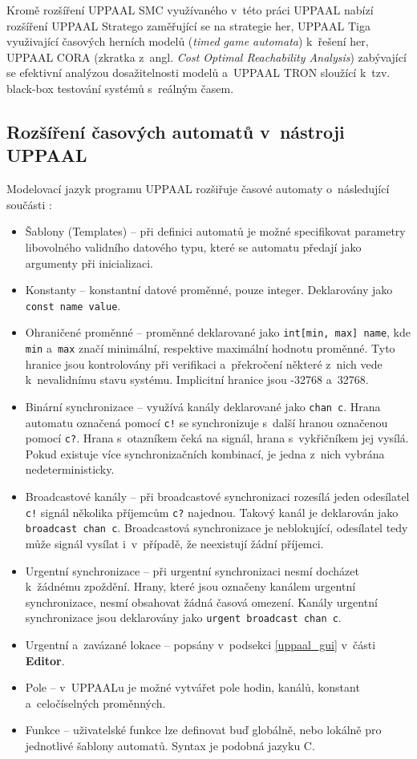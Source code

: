 Kromě rozšíření UPPAAL SMC využívaného v~této práci UPPAAL nabízí rozšíření UPPAAL Stratego zaměřující se na strategie her, UPPAAL Tiga využivající časových herních modelů (\textit{timed game automata}) k~řešení her, UPPAAL CORA (zkratka z~angl. \textit{Cost Optimal Reachability Analysis}) zabývající se efektivní analýzou dosažitelnosti modelů a~UPPAAL TRON sloužící k~tzv. black-box testování systémů s~reálným časem.

\subsection{Rozšíření časových automatů v~nástroji UPPAAL}
Modelovací jazyk programu UPPAAL rozšiřuje časové automaty o~následující součásti \cite{uppaal_intro}:

\begin{itemize}
    \item Šablony (Templates) -- při definici automatů je možné specifikovat parametry libovolného validního datového typu, které se automatu předají jako argumenty při inicializaci.
    \item Konstanty -- konstantní datové proměnné, pouze integer. Deklarovány jako \texttt{const name value}.
    \item Ohraničené proměnné -- proměnné deklarované jako \texttt{int[min, max] name}, kde \texttt{min} a~\texttt{max} značí minimální, respektive maximální hodnotu proměnné. Tyto hranice jsou kontrolovány při verifikaci a~překročení některé z~nich vede k~nevalidnímu stavu systému. Implicitní hranice jsou -32768 a~32768.
    \item Binární synchronizace -- využívá kanály deklarované jako \texttt{chan c}. Hrana automatu označená pomocí \texttt{c!} se synchronizuje s~další hranou označenou pomocí \texttt{c?}. Hrana s~otazníkem čeká na signál, hrana s~vykřičníkem jej vysílá. Pokud existuje více synchronizačních kombinací, je jedna z~nich vybrána nedeterministicky.
    \item Broadcastové kanály -- při broadcastové synchronizaci rozesílá jeden odesílatel \texttt{c!} signál několika příjemcům \texttt{c?} najednou. Takový kanál je deklarován jako \texttt{broadcast chan c}. Broadcastová synchronizace je neblokující, odesílatel tedy může signál vysílat i~v~případě, že neexistují žádní příjemci.
    \item Urgentní synchronizace -- při urgentní synchronizaci nesmí docházet k~žádnému zpoždění. Hrany, které jsou označeny kanálem urgentní synchronizace, nesmí obsahovat žádná časová omezení. Kanály urgentní synchronizace jsou deklarovány jako \texttt{urgent broadcast chan c}.
    \item Urgentní a~zavázané lokace -- popsány v~podsekci \ref{uppaal_gui} v~části \textbf{Editor}.
    \item Pole -- v~UPPAALu je možné vytvářet pole hodin, kanálů, konstant a~celočíselných proměnných.
    \item Funkce -- uživatelské funkce lze definovat buď globálně, nebo lokálně pro jednotlivé šablony automatů. Syntax je podobná jazyku C.
\end{itemize}

